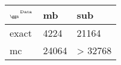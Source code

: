 \begin{tabular}{lll}
    \toprule
    $_{\text{\tiny{\ggn}}}$$^{\text{\tiny{Data}}}$ & mb & sub \\
    \midrule
    exact & 4224
              & 21164 \\
    mc   & 24064
              & > 32768 \\
    \bottomrule
\end{tabular}